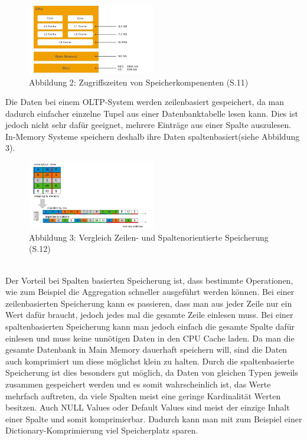 \\
\begin{figure}[ht]
  \begin{center}
  \includegraphics[width=0.5\textwidth]{images/cpu.png}
  \end{center}
  \caption{Abbildung 2: Zugriffszeiten von Speicherkompenenten (\cite{sap}S.11)}
  \label{fig_2}
\end{figure} 
Die Daten bei einem OLTP-System werden zeilenbasiert gespeichert, da man dadurch einfacher einzelne Tupel aus einer Datenbanktabelle lesen kann. Dies ist jedoch nicht sehr dafür geeignet, mehrere Einträge aus einer Spalte auszulesen.
In-Memory Systeme speichern deshalb ihre Daten spaltenbasiert(siehe Abbildung 3).
\begin{figure}[ht]
  \begin{center}
  \includegraphics[width=0.5\textwidth]{images/mappingtomemory.png}
  \end{center}
  \caption{Abbildung 3: Vergleich Zeilen- und Spaltenorientierte Speicherung (\cite{sap}S.12)}
  \label{fig_3}
\end{figure} 
\\
Der Vorteil bei Spalten basierten Speicherung ist, dass bestimmte Operationen, wie zum Beispiel die Aggregation schneller ausgeführt werden können. Bei einer zeilenbasierten Speicherung kann es passieren, dass man aus jeder Zeile nur ein Wert dafür braucht, jedoch jedes mal die gesamte Zeile einlesen muss. Bei einer spaltenbasierten Speicherung kann man jedoch einfach die gesamte Spalte dafür einlesen und muss keine unnötigen Daten in den CPU Cache laden.
Da man die gesamte Datenbank in Main Memory dauerhaft speichern will, sind die Daten auch komprimiert um diese möglichst klein zu halten.
Durch die spaltenbasierte Speicherung ist dies besonders gut möglich, da Daten von gleichen Typen jeweils zusammen gespeichert werden und es somit wahrscheinlich ist, das Werte mehrfach auftreten, da viele Spalten meist eine geringe Kardinalität Werten besitzen. Auch NULL Values oder Default Values sind meist der einzige Inhalt einer Spalte und somit komprimierbar. Dadurch kann man mit zum Beispiel einer Dictionary-Komprimierung viel Speicherplatz sparen.
